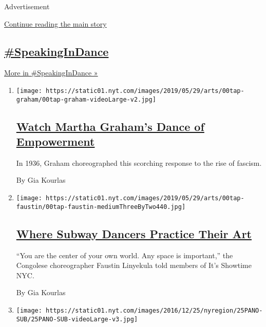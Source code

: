 Advertisement

\protect\hyperlink{after-mid1}{Continue reading the main story}

\hypertarget{speakingindance}{%
\subsection{\texorpdfstring{\href{/column/speakingindance}{\#SpeakingInDance}}{\#SpeakingInDance}}\label{speakingindance}}

\href{/column/speakingindance}{More in \#SpeakingInDance »}

\begin{enumerate}
\def\labelenumi{\arabic{enumi}.}
\item
  \texttt{[image: https://static01.nyt.com/images/2019/05/29/arts/00tap-graham/00tap-graham-videoLarge-v2.jpg]}

  \hypertarget{watch-martha-grahams-dance-of-empowerment}{%
  \subsection{\texorpdfstring{\href{/interactive/2019/05/30/arts/dance/speaking-in-dance-martha-graham.html}{Watch
  Martha Graham's Dance of
  Empowerment}}{Watch Martha Graham's Dance of Empowerment}}\label{watch-martha-grahams-dance-of-empowerment}}

  In 1936, Graham choreographed this scorching response to the rise of
  fascism.

  By Gia Kourlas
\item
  \texttt{[image: https://static01.nyt.com/images/2019/05/29/arts/00tap-faustin/00tap-faustin-mediumThreeByTwo440.jpg]}

  \hypertarget{where-subway-dancers-practice-their-art}{%
  \subsection{\texorpdfstring{\href{/interactive/2019/05/30/arts/dance/speaking-in-dance-showtime-faustin.html}{Where
  Subway Dancers Practice Their
  Art}}{Where Subway Dancers Practice Their Art}}\label{where-subway-dancers-practice-their-art}}

  ``You are the center of your own world. Any space is important,'' the
  Congolese choreographer Faustin Linyekula told members of It's
  Showtime NYC.

  By Gia Kourlas
\item
  \texttt{[image: https://static01.nyt.com/images/2016/12/25/nyregion/25PANO-SUB/25PANO-SUB-videoLarge-v3.jpg]}


\end{enumerate}
